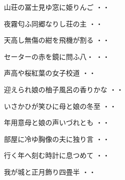 \vspace{0.6cm}
\begin{shiika}山荘の冨士見ゆ窓に姫りんご
\hfill{・・}\end{shiika}
\vspace{0.6cm}
\begin{shiika}夜霧匂ふ同郷なりし荘の主
\hfill{・・}\end{shiika}
\vspace{0.6cm}
\begin{shiika}天高し無傷の紺を飛機が割る
\hfill{・・}\end{shiika}
\vspace{0.6cm}
\begin{shiika}セーターの赤を鏡に問ふ八・
\hfill{・・}\end{shiika}
\vspace{0.6cm}
\begin{shiika}声高や桜紅葉の女子校道
\hfill{・・}\end{shiika}
\vspace{0.6cm}
\begin{shiika}迎えられ娘の柚子風呂の香りかな
\hfill{・・}\end{shiika}
\vspace{0.6cm}
\begin{shiika}いさかひが笑ひに母と娘の冬至
\hfill{・・}\end{shiika}
\vspace{0.6cm}
\begin{shiika}年用意母と娘の声いづれとも
\hfill{・・}\end{shiika}
\vspace{0.6cm}
\begin{shiika}部屋に冷ゆ胸像の夫に独り言
\hfill{・・}\end{shiika}
\vspace{0.6cm}
\begin{shiika}行く年へ刻む時計に息つめて
\hfill{・・}\end{shiika}
\vspace{0.6cm}
\begin{shiika}我が城と正月飾り四畳半
\hfill{・・}\end{shiika}
